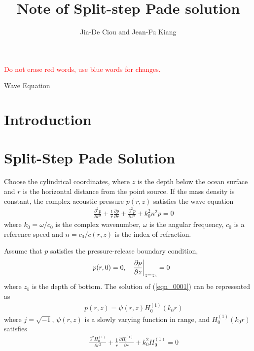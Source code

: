 \documentclass[journal,onecolumn]{IEEEtran}
\begin{document}
\title{Note of Split-step Pade solution}         
\author{Jia-De Ciou and Jean-Fu Kiang}        
\date{}          

\markboth{}{}

\maketitle

\begin{abstract}

\end{abstract}

\textcolor{red}{Do not erase red words, use blue words for changes.}


\begin{IEEEkeywords}
Wave Equation
\end{IEEEkeywords}

\section{Introduction}


\section{Split-Step Pade Solution}

Choose the cylindrical coordinates, where $z$ is the depth below the ocean surface and $r$ is the horizontal distance 
from the point source. 
If the mass density is constant, the complex acoustic pressure $p(r, z)$ satisfies the wave equation \cite{COA}
\begin{eqnarray}
&&\frac{\partial^2 p}{\partial r^2} + \frac{1}{r} \frac{\partial p}{\partial r}+ \frac{\partial^2 p}{\partial z^2} + k_0^2 n^2  p = 0
\label{eqn_0001}
\end{eqnarray}
where $k_0 = \omega / c_0$ is the complex wavenumber, $\omega$ is the angular frequency, $c_0$ is a reference speed 
and $n = c_0 / c(r, z)$ is the index of refraction.

Assume that $p$ satisfies the pressure-release boundary condition, 
\begin{eqnarray}
&&p(r, 0) = 0, \hspace{0.3 cm} \left. \frac{\partial p}{\partial z} \right|_{z = z_b} = 0  
\label{eqn_00011}
\end{eqnarray}
where $z_b$ is the depth of bottom.
The solution of (\ref{eqn_0001}) can be represented as
\begin{eqnarray}
&&p(r, z) = \psi(r, z) H_0^{(1)}(k_0 r)
\label{eqn_0002} 
\end{eqnarray}
where $j = \sqrt{-1}$, $\psi(r, z)$ is a slowly varying function in range, and $H_0^{(1)}(k_0 r)$ satisfies
\begin{eqnarray}
&&\frac{\partial^2 H^{(1)}_0}{\partial r^2} + \frac{1}{r} \frac{\partial H^{(1)}_0}{\partial r} + k_0^2 H^{(1)}_0 = 0
\label{eqn_0003} 
\end{eqnarray}
\end{document}
